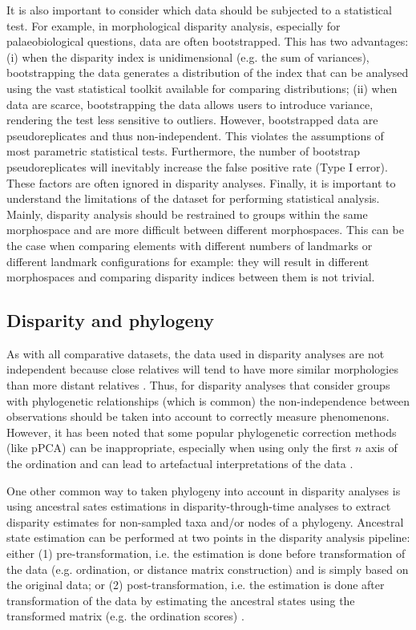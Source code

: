 \documentclass[12pt,letterpaper]{article}
\begin{document}
It is also important to consider which data should be subjected to a statistical test.
For example, in morphological disparity analysis, especially for palaeobiological questions, data are often bootstrapped.
This has two advantages: (i) when the disparity index is unidimensional (e.g. the sum of variances), bootstrapping the data generates a distribution of the index that can be analysed using the vast statistical toolkit available for comparing distributions; (ii) when data are scarce, bootstrapping the data allows users to introduce variance, rendering the test less sensitive to outliers.
However, bootstrapped data are pseudoreplicates and thus non-independent.
This violates the assumptions of most parametric statistical tests.
Furthermore, the number of bootstrap pseudoreplicates will inevitably increase the false positive rate (Type I error).
These factors are often ignored in disparity analyses.
Finally, it is important to understand the limitations of the dataset for performing statistical analysis.
Mainly, disparity analysis should be restrained to groups within the same morphospace and are more difficult between different morphospaces.
This can be the case when comparing elements with different numbers of landmarks or different landmark configurations for example: they will result in different morphospaces and comparing disparity indices between them is not trivial.


\subsection{Disparity and phylogeny} \label{section:phylo}

As with all comparative datasets, the data used in disparity analyses are not independent because close relatives will tend to have more similar morphologies than more distant relatives \citep{Harvey1998-xg}.
Thus, for disparity analyses that consider groups with phylogenetic relationships (which is common) the non-independence between observations should be taken into account to correctly measure phenomenons.
However, it has been noted that some popular phylogenetic correction methods (like pPCA) can be inappropriate, especially when using only the first $n$ axis of the ordination and can lead to artefactual interpretations of the data \citep[such as wrongly supported ``early burst'' type patterns;][]{Uyeda2015}.

One other common way to taken phylogeny into account in disparity analyses is using ancestral sates estimations in disparity-through-time analyses to extract disparity estimates for non-sampled taxa and/or nodes of a phylogeny.
Ancestral state estimation can be performed at two points in the disparity analysis pipeline: either (1) pre-transformation, i.e. the estimation is done before transformation of the data (e.g. ordination, or distance matrix construction) and is simply based on the original data; or (2) post-transformation, i.e. the estimation is done after transformation of the data by estimating the ancestral states using the transformed matrix (e.g. the ordination scores) \citep{lloyd2018}.
\end{document}
